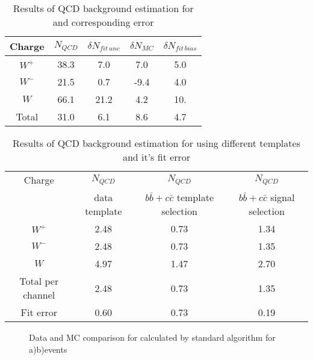 \begin{table}[!tbp]
    \caption{Results of QCD background estimation for \wenu and corresponding error}
	\label{tab:QCDWenu}
	\begin{center}
		\begin{tabular}{c | c | c | c | c }
		\hline
		    Charge & $N_{QCD}$ & $ \delta N_{fit\, unc} $ & $\delta N_{MC}$ & $\delta N_{fit\, bias}$ \\
		    \hline
		    $W^{+}$ & 38.3 & 7.0 & 7.0 & 5.0 \\
		    $W^{-} $ & 21.5 & 0.7 &  -9.4 & 4.0 \\
		    $W$ & 66.1 & 21.2 & 4.2 & 10.  \\
		    \hline
		    \hline
		    Total & 31.0 & 6.1 & 8.6 & 4.7 \\
		    \hline
		\end{tabular}
	\end{center}
\end{table}

\begin{table}[!tbp]
    \caption{Results of QCD background estimation for \wmunu using different templates and it's fit error}
	\label{tab:QCDWmunu}
	\begin{center}
		\begin{tabular}{c | c | c | c  }
		\hline
		    Charge & $N_{QCD}$ & $N_{QCD}$ & $N_{QCD}$ \\
		    & data template & $b\bar{b}+c\bar{c}$ template selection & $b\bar{b}+c\bar{c}$ signal selection \\
		    \hline
		    $W^{+}$ & 2.48 & 0.73 & 1.34 \\
		    $W^{-} $ & 2.48 & 0.73 & 1.35 \\
		    $W$ & 4.97 & 1.47 & 2.70  \\
		    \hline
		    \hline
		    Total per channel & 2.48 & 0.73 & 1.35 \\
		    Fit error & 0.60 & 0.73 & 0.19 \\
		    \hline
		\end{tabular}
	\end{center}
\end{table}



\begin{figure}[!tbp]
\begin{minipage}[h]{0.49\linewidth}
\end{minipage}
\hfill
\begin{minipage}[h]{0.49\linewidth}
\end{minipage}
\caption{Data and MC comparison for \etmiss calculated by standard \atlas algorithm for a)\wenu b)\wmunu events}
\label{ris:TemplateVar}
\end{figure}

